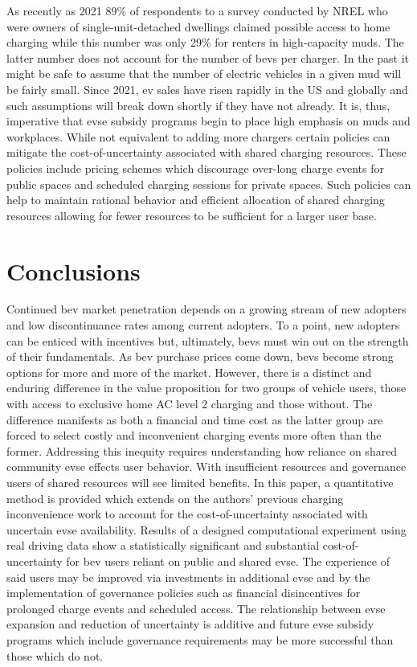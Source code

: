 \documentclass[letterpaper]{sae}
\begin{document}
As recently as 2021 89\% of respondents to a survey conducted by NREL who were owners of single-unit-detached dwellings claimed possible access to home charging while this number was only 29\% for renters in high-capacity \glspl{mud}. The latter number does not account for the number of \glspl{bev} per charger. In the past it might be safe to assume that the number of electric vehicles in a given \gls{mud} will be fairly small. Since 2021, \gls{ev} sales have risen rapidly in the US and globally \cite{KBB_2023,EVVolumes_2023} and such assumptions will break down shortly if they have not already. It is, thus, imperative that \gls{evse} subsidy programs begin to place high emphasis on \glspl{mud} and workplaces. While not equivalent to adding more chargers certain policies can mitigate the cost-of-uncertainty associated with shared charging resources. These policies include pricing schemes which discourage over-long charge events for public spaces \cite{Nicholas_2013} and scheduled charging sessions for private spaces. Such policies can help to maintain rational behavior and efficient allocation of shared charging resources allowing for fewer resources to be sufficient for a larger user base.

\section{Conclusions}\label{sec:concusions}

Continued \gls{bev} market penetration depends on a growing stream of new adopters and low discontinuance rates among current adopters. To a point, new adopters can be enticed with incentives but, ultimately, \glspl{bev} must win out on the strength of their fundamentals. As \gls{bev} purchase prices come down, \glspl{bev} become strong options for more and more of the market. However, there is a distinct and enduring difference in the value proposition for two groups of vehicle users, those with access to exclusive home AC level 2 charging and those without. The difference manifests as both a financial and time cost as the latter group are forced to select costly and inconvenient charging events more often than the former. Addressing this inequity requires understanding how reliance on shared community \gls{evse} effects user behavior. With insufficient resources and governance users of shared resources will see limited benefits. In this paper, a quantitative method is provided which extends on the authors' previous charging inconvenience work to account for the cost-of-uncertainty associated with uncertain \gls{evse} availability. Results of a designed computational experiment using real driving data show a statistically significant and substantial cost-of-uncertainty for \gls{bev} users reliant on public and shared \gls{evse}. The experience of said users may be improved via investments in additional \gls{evse} and by the implementation of governance policies such as financial disincentives for prolonged charge events and scheduled access. The relationship between \gls{evse} expansion and reduction of uncertainty is additive and future \gls{evse} subsidy programs which include governance requirements may be more successful than those which do not.



\end{document}
